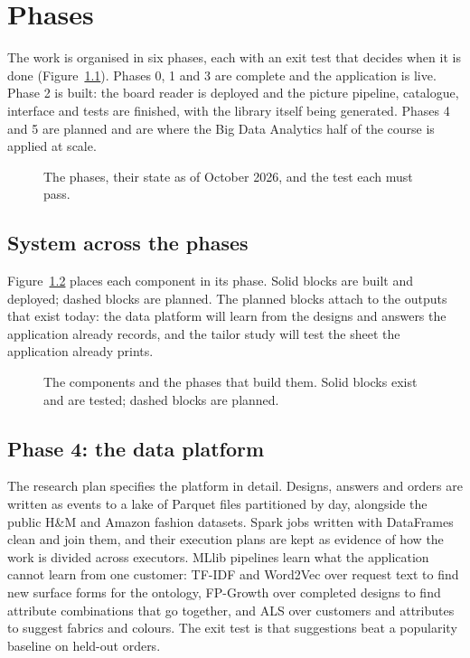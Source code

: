 \chapter{Phases}\label{ch:phases}

The work is organised in six phases, each with an exit test that decides when it is done (Figure~\ref{fig:roadmap}). Phases 0, 1 and 3 are complete and the application is live. Phase 2 is built: the board reader is deployed and the picture pipeline, catalogue, interface and tests are finished, with the library itself being generated. Phases 4 and 5 are planned and are where the Big Data Analytics half of the course is applied at scale.

\begin{figure}[tbp]
\centering
\resizebox{\linewidth}{!}{}
\caption{The phases, their state as of October 2026, and the test each must pass.}
\label{fig:roadmap}
\end{figure}

\section{System across the phases}
Figure~\ref{fig:across} places each component in its phase. Solid blocks are built and deployed; dashed blocks are planned. The planned blocks attach to the outputs that exist today: the data platform will learn from the designs and answers the application already records, and the tailor study will test the sheet the application already prints.

\begin{figure}[tbp]
\centering
\resizebox{\linewidth}{!}{}
\caption{The components and the phases that build them. Solid blocks exist and are tested; dashed blocks are planned.}
\label{fig:across}
\end{figure}

\section{Phase 4: the data platform}
The research plan specifies the platform in detail. Designs, answers and orders are written as events to a lake of Parquet files partitioned by day, alongside the public H\&M and Amazon fashion datasets. Spark jobs written with DataFrames clean and join them, and their execution plans are kept as evidence of how the work is divided across executors. MLlib pipelines learn what the application cannot learn from one customer: TF-IDF and Word2Vec over request text to find new surface forms for the ontology, FP-Growth over completed designs to find attribute combinations that go together, and ALS over customers and attributes to suggest fabrics and colours. The exit test is that suggestions beat a popularity baseline on held-out orders.

